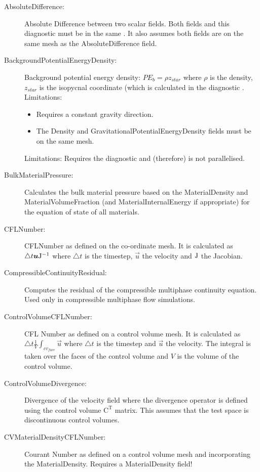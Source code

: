 \begin{description}
\item[AbsoluteDifference:]Absolute Difference between two scalar fields. Both fields and this diagnostic  must be in the same . It also assumes both fields are on the same mesh as the AbsoluteDifference field.  
\item[BackgroundPotentialEnergyDensity:]Background potential energy density: $PE_b = \rho z_{star}$ where $\rho$ is the density, $z_{star}$ is the isopycnal coordinate (which is calculated in the diagnostic . \\Limitations: 
	\begin{itemize}
	\item Requires a constant gravity direction. 
	\item The Density and GravitationalPotentialEnergyDensity fields must be on the same mesh. 
	\end{itemize}
Limitations: Requires the diagnostic  and (therefore) is not parallelised.
\item[BulkMaterialPressure:]Calculates the bulk material pressure based on the MaterialDensity and MaterialVolumeFraction (and MaterialInternalEnergy if appropriate) for the equation of state of all materials.
\item[CFLNumber:]CFLNumber as defined on the co-ordinate mesh. It is calculated as $\triangle t {\mbox{\boldmath$u$}} \mathrm{J}^{-1}$ where $\triangle t$ is the timestep, $\vec{u}$ the velocity and $\mathrm{J}$ the Jacobian. 
\item[CompressibleContinuityResidual:]Computes the residual of the compressible multiphase continuity equation. Used only in compressible multiphase flow simulations. 
\item[ControlVolumeCFLNumber:]CFL Number as defined on a control volume mesh. It is calculated as $\triangle t \frac{1}{V} \int _{cv_{face}} \vec{u}$ where $\triangle t$ is the timestep and $\vec{u}$ the velocity. The integral is taken over the faces of the control volume and $V$ is the volume of the control volume.
\item[ControlVolumeDivergence:]Divergence of the velocity field where the divergence operator is defined using the control volume $\mathrm{C}^\mathrm{T}$ matrix. This assumes that the test space is discontinuous control volumes.
\item[CVMaterialDensityCFLNumber:]Courant Number as defined on a control volume mesh and incorporating the MaterialDensity. Requires a MaterialDensity field!

\end{description}
